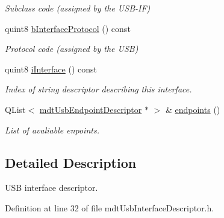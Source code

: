 \begin{DoxyCompactItemize}
\begin{DoxyCompactList}\small\item\em Subclass code (assigned by the USB-\/IF) \end{DoxyCompactList}\item 
\hypertarget{classmdt_usb_interface_descriptor_a9be6f58db4a2fdf1e3a1a0acf1b838f7}{
quint8 \hyperlink{classmdt_usb_interface_descriptor_a9be6f58db4a2fdf1e3a1a0acf1b838f7}{bInterfaceProtocol} () const }
\label{classmdt_usb_interface_descriptor_a9be6f58db4a2fdf1e3a1a0acf1b838f7}

\begin{DoxyCompactList}\small\item\em Protocol code (assigned by the USB) \end{DoxyCompactList}\item 
\hypertarget{classmdt_usb_interface_descriptor_aa975e2dc2a326efe391649c5096286eb}{
quint8 \hyperlink{classmdt_usb_interface_descriptor_aa975e2dc2a326efe391649c5096286eb}{iInterface} () const }
\label{classmdt_usb_interface_descriptor_aa975e2dc2a326efe391649c5096286eb}

\begin{DoxyCompactList}\small\item\em Index of string descriptor describing this interface. \end{DoxyCompactList}\item 
\hypertarget{classmdt_usb_interface_descriptor_a584bd81b092884295f1ebe1e0db55487}{
QList$<$ \hyperlink{classmdt_usb_endpoint_descriptor}{mdtUsbEndpointDescriptor} $\ast$ $>$ \& \hyperlink{classmdt_usb_interface_descriptor_a584bd81b092884295f1ebe1e0db55487}{endpoints} ()}
\label{classmdt_usb_interface_descriptor_a584bd81b092884295f1ebe1e0db55487}

\begin{DoxyCompactList}\small\item\em List of avaliable enpoints. \end{DoxyCompactList}\end{DoxyCompactItemize}


\subsection{Detailed Description}
USB interface descriptor. 

Definition at line 32 of file mdtUsbInterfaceDescriptor.h.



